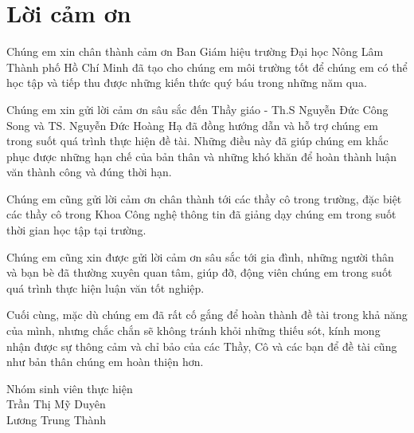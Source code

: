 \chapter*{Lời cảm ơn}
\label{thanks}

Chúng em xin chân thành cảm ơn Ban Giám hiệu trường Đại học Nông Lâm Thành phố Hồ Chí Minh đã tạo cho chúng em môi trường tốt để chúng em có thể học tập và tiếp thu được những kiến thức quý báu trong những năm qua.

Chúng em xin gửi lời cảm ơn sâu sắc đến Thầy giáo - Th.S Nguyễn Đức Công Song và TS. Nguyễn Đức Hoàng Hạ đã đồng hướng dẫn và hỗ trợ chúng em trong suốt quá trình thực hiện đề tài. Những điều này đã giúp chúng em khắc phục được những hạn chế của bản thân và những khó khăn để hoàn thành luận văn thành công và đúng thời hạn.

Chúng em cũng gửi lời cảm ơn chân thành tới các thầy cô trong trường, đặc biệt các thầy cô trong Khoa Công nghệ thông tin đã giảng dạy chúng em trong suốt thời gian học tập tại trường.

Chúng em cũng xin được gửi lời cảm ơn sâu sắc tới gia đình, những người thân và bạn bè đã thường xuyên quan tâm, giúp đỡ, động viên chúng em trong suốt quá trình thực hiện luận văn tốt nghiệp.

Cuối cùng, mặc dù chúng em đã rất cố gắng để hoàn thành đề tài trong khả năng của mình, nhưng chắc chắn sẽ không tránh khỏi những thiếu sót, kính mong nhận được sự thông cảm và chỉ bảo của các Thầy, Cô và các bạn để đề tài cũng như bản thân chúng em hoàn thiện hơn.
\begin{flushright}
    Nhóm sinh viên thực hiện \\
    Trần Thị Mỹ Duyên \\
    Lương Trung Thành
\end{flushright}